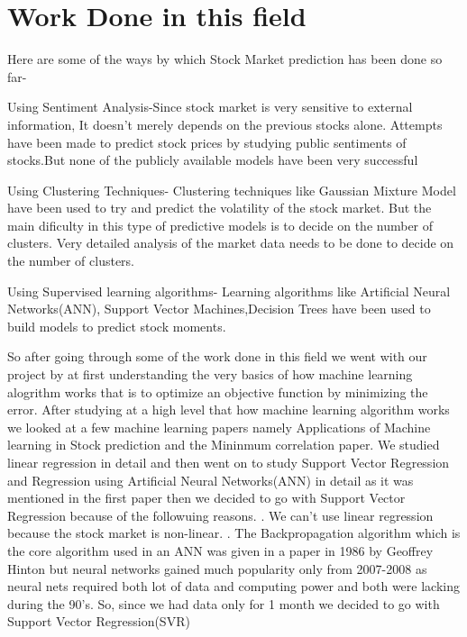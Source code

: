 \documentclass{report}
\begin{document}
\section{Work Done in this field}
Here are some of the ways by which Stock Market prediction has been done so far-

Using Sentiment Analysis-Since stock market is very sensitive to external information, It doesn't merely depends on the 
previous stocks alone. Attempts have been made to predict stock prices by studying public sentiments of stocks.But none of
the publicly available models have been very successful \newline

Using Clustering Techniques- Clustering techniques like Gaussian Mixture Model have been used to try and predict the volatility of the stock market. But the main dificulty in this type of predictive models is to decide on the number of clusters. Very detailed analysis of the market data needs to be done to decide on the number of clusters.\newline

Using Supervised learning algorithms- Learning algorithms like Artificial Neural Networks(ANN), Support Vector Machines,Decision Trees have been used to build models to predict stock moments.

So after going through some of the work done in this field we went with our project by at first understanding the very basics of how machine learning alogrithm works that is to optimize an objective function by minimizing the error.\newline\newline
After studying at a high level that how machine learning algorithm works we looked at a few machine learning papers namely Applications of Machine learning in Stock prediction and the Mininmum correlation paper.\newline\newline
We studied linear regression in detail and then went on to study Support Vector Regression and Regression using Artificial Neural Networks(ANN) in detail as it was mentioned in the first paper then we decided to go with Support Vector Regression because of the followuing reasons.\newline
{}. We can't use linear regression because the stock market is non-linear.
\newline{}. The Backpropagation algorithm which is the core algorithm used in an ANN was given in a paper in 1986 by Geoffrey Hinton 
   but neural networks gained much popularity only from 2007-2008 as neural nets required both lot of data and computing power and both were lacking during the 90's.\newline\newline
 So, since we had  data only for  1 month we decided to go with Support Vector Regression(SVR)
\end{document}
